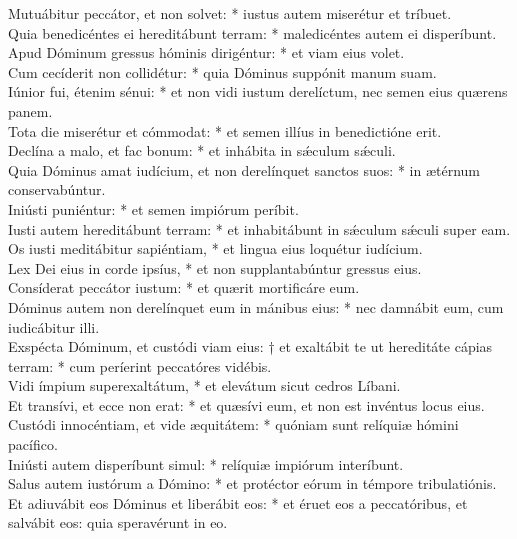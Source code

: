 {	Mutuábitur peccátor, et non solvet: * iustus autem miserétur et tríbuet. \\
	Quia benedicéntes ei hereditábunt terram: * maledicéntes autem ei disperíbunt. \\
	Apud Dóminum gressus hóminis dirigéntur: * et viam eius volet. \\
	Cum cecíderit non collidétur: * quia Dóminus suppónit manum suam. \\
	Iúnior fui, étenim sénui: * et non vidi iustum derelíctum, nec semen eius quærens panem. \\
	Tota die miserétur et cómmodat: * et semen illíus in benedictióne erit. \\
	Declína a malo, et fac bonum: * et inhábita in sǽculum sǽculi. \\
	Quia Dóminus amat iudícium, et non derelínquet sanctos suos: * in ætérnum conservabúntur. \\
	Iniústi puniéntur: * et semen impiórum períbit. \\
	Iusti autem hereditábunt terram: * et inhabitábunt in sǽculum sǽculi super eam. \\
	Os iusti meditábitur sapiéntiam, * et lingua eius loquétur iudícium. \\
	Lex Dei eius in corde ipsíus, * et non supplantabúntur gressus eius. \\
	Consíderat peccátor iustum: * et quærit mortificáre eum. \\
	Dóminus autem non derelínquet eum in mánibus eius: * nec damnábit eum, cum iudicábitur illi. \\
	Exspécta Dóminum, et custódi viam eius: † et exaltábit te ut hereditáte cápias terram: * cum períerint peccatóres vidébis. \\
	Vidi ímpium superexaltátum, * et elevátum sicut cedros Líbani. \\
	Et transívi, et ecce non erat: * et quæsívi eum, et non est invéntus locus eius. \\
	Custódi innocéntiam, et vide æquitátem: * quóniam sunt relíquiæ hómini pacífico. \\
	Iniústi autem disperíbunt simul: * relíquiæ impiórum interíbunt. \\
	Salus autem iustórum a Dómino: * et protéctor eórum in témpore tribulatiónis. \\
	Et adiuvábit eos Dóminus et liberábit eos: * et éruet eos a peccatóribus, et salvábit eos: quia speravérunt in eo.
}

